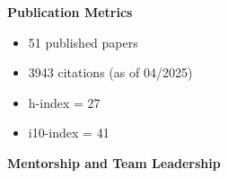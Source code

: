 \documentclass{article}
\begin{document}
%
\vspace{0.5em}
%
{\large  \textbf{Publication Metrics}}
\begin{adjustwidth}{5mm}{}
  \begin{multicols}{2}
    \begin{itemize}[noitemsep,topsep=0pt, leftmargin=0mm]
      \item 51 published papers
      \item 3943 citations (as of 04/2025)
      \item h-index = 27
      \item i10-index = 41
    \end{itemize}
  \end{multicols}
\end{adjustwidth}
\vspace{3mm}
{\large  \textbf{Mentorship and Team Leadership}}
\end{document}
